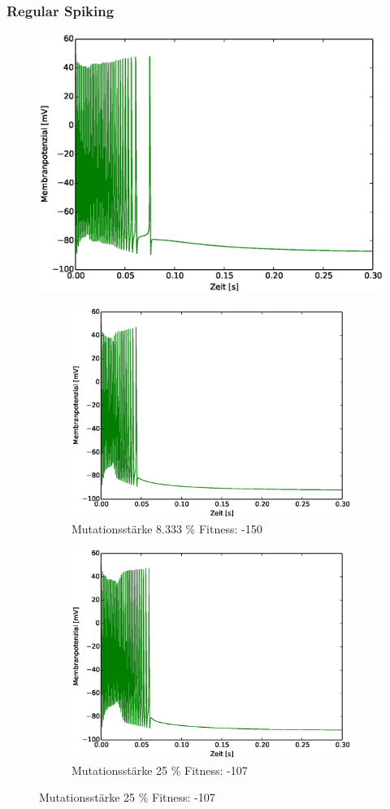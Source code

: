\begin{frame}
  \frametitle{Regular Spiking}
  \begin{figure}
    \centering
    \includegraphics[viewport=19 10 532 394,width=0.35\linewidth]{genetic/rs-base.eps}
    \caption*{\scriptsize{Mutationsstärke 15 \%} \tiny{Fitness: -103}}
    \begin{subfigure}{.5\textwidth}
      \centering
      \includegraphics*[viewport=19 10 532 394,width=0.7\linewidth]{genetic/rs-mut008333.eps}
      \caption*{\scriptsize{Mutationsstärke 8.333 \%} \tiny{Fitness: -150}}
    \end{subfigure}%
    \begin{subfigure}{.5\textwidth}
      \centering
      \includegraphics*[viewport=19 10 532 394,width=0.7\linewidth]{genetic/rs-mut025.eps}
      \caption*{\scriptsize{Mutationsstärke 25 \%} \tiny{Fitness: -107}}
    \end{subfigure}
  \end{figure}
\end{frame}

